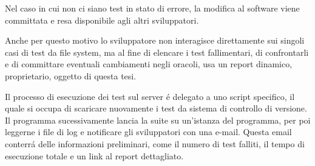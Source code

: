             Nel caso in cui non ci siano test in stato di errore, la modifica al software viene committata e resa disponibile agli altri sviluppatori.
            
            Anche per questo motivo lo sviluppatore non interagisce direttamente sui singoli casi di test da file system,
            ma al fine di elencare i test fallimentari, di confrontarli e di committare eventuali cambiamenti negli oracoli, usa un report dinamico, 
            proprietario, oggetto di questa tesi.

            Il processo di esecuzione dei test sul server \'e delegato a uno script specifico, il quale si occupa di scaricare nuovamente i test da sistema di controllo di versione.
            Il programma sucessivamente lancia la suite su un'istanza del programma, per poi leggerne i file di log e notificare gli sviluppatori con una e-mail.
            Questa email conterr\'a delle informazioni preliminari, come il numero di test falliti, il tempo di esecuzione totale e un link al report dettagliato.
